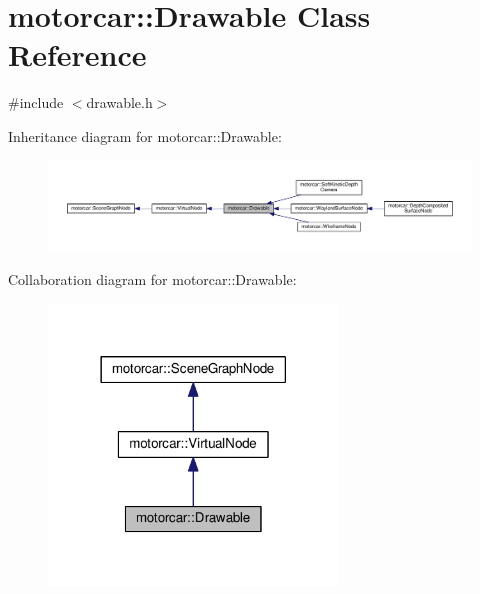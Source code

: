 \hypertarget{classmotorcar_1_1Drawable}{\section{motorcar\-:\-:Drawable Class Reference}
\label{classmotorcar_1_1Drawable}
}


{\ttfamily \#include $<$drawable.\-h$>$}



Inheritance diagram for motorcar\-:\-:Drawable\-:
\nopagebreak
\begin{figure}[H]
\begin{center}
\leavevmode
\includegraphics[width=350pt]{classmotorcar_1_1Drawable__inherit__graph}
\end{center}
\end{figure}


Collaboration diagram for motorcar\-:\-:Drawable\-:
\nopagebreak
\begin{figure}[H]
\begin{center}
\leavevmode
\includegraphics[width=218pt]{classmotorcar_1_1Drawable__coll__graph}
\end{center}
\end{figure}
